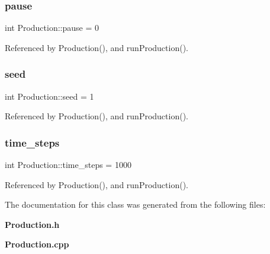 \subsubsection{pause}
{\footnotesize\ttfamily int Production\+::pause = 0\hspace{0.3cm}{\ttfamily [private]}}



Referenced by Production(), and run\+Production().

\mbox{\label{classProduction_adb474287b0143fccb9d440ccc54ba624}} 
\subsubsection{seed}
{\footnotesize\ttfamily int Production\+::seed = 1\hspace{0.3cm}{\ttfamily [private]}}



Referenced by Production(), and run\+Production().

\mbox{\label{classProduction_a922838be6032bb4a479537ff1921aa5d}} 
\subsubsection{time\+\_\+steps}
{\footnotesize\ttfamily int Production\+::time\+\_\+steps = 1000\hspace{0.3cm}{\ttfamily [private]}}



Referenced by Production(), and run\+Production().



The documentation for this class was generated from the following files\+:\begin{DoxyCompactItemize}
\item 
\textbf{ Production.\+h}\item 
\textbf{ Production.\+cpp}\end{DoxyCompactItemize}
